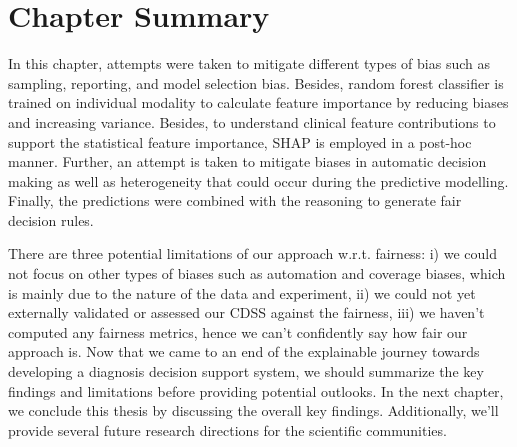 \section{Chapter Summary}\label{chapter_9:conclusion}
In this chapter, attempts were taken to mitigate different types of bias such as sampling, reporting, and model selection bias. Besides, random forest classifier is  trained on individual modality to calculate feature importance by reducing biases and increasing variance. Besides, to understand clinical feature contributions to support the statistical feature importance, SHAP is employed in a post-hoc manner. Further, an attempt is taken to mitigate biases in automatic decision making as well as heterogeneity that could occur during the predictive modelling. Finally, the predictions were combined with the reasoning to generate fair decision rules. 


\hspace*{3.5mm} There are three potential limitations of our approach w.r.t. fairness: i) we could not focus on other types of biases such as automation and coverage biases, which is mainly due to the nature of the data and experiment, ii) we could not yet externally validated or assessed our CDSS against the fairness, iii) we haven't computed any fairness metrics, hence we can't confidently say how fair our approach is. Now that we came to an end of the explainable journey towards developing a diagnosis decision support system, we should summarize the key findings and limitations before providing potential outlooks. In the next chapter, we conclude this thesis by discussing the overall key findings. Additionally, we'll provide several future research directions for the scientific communities. 



